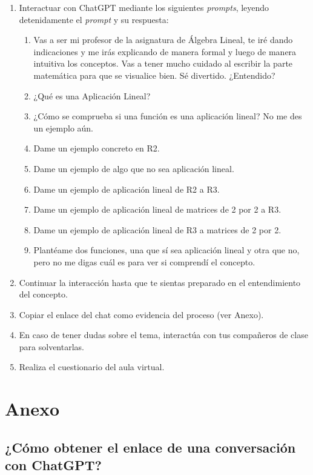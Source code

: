 \documentclass[a4,11pt]{aleph-notas}
\begin{document}
\begin{enumerate}[leftmargin=*]
    \item Interactuar con ChatGPT mediante los siguientes \textit{prompts}, leyendo detenidamente el \textit{prompt} y su respuesta:
    \begin{enumerate}[label=\textit{Prompt \arabic*.},leftmargin=2.1cm]
        \item Vas a ser mi profesor de la asignatura de Álgebra Lineal, te iré dando indicaciones y me irás explicando de manera formal y luego de manera intuitiva los conceptos. Vas a tener mucho cuidado al escribir la parte matemática para que se visualice bien. Sé divertido. ¿Entendido?
        \item ¿Qué es una Aplicación Lineal?
        \item ¿Cómo se comprueba si una función es una aplicación lineal? No me des un ejemplo aún.
        \item Dame un ejemplo concreto en R2.
        \item Dame un ejemplo de algo que no sea aplicación lineal.
        \item Dame un ejemplo de aplicación lineal de R2 a R3.
        \item Dame un ejemplo de aplicación lineal de matrices de 2 por 2 a R3.
        \item Dame un ejemplo de aplicación lineal de R3 a matrices de 2 por 2.
        \item Plantéame dos funciones, una que sí sea aplicación lineal y otra que no, pero no me digas cuál es para ver si comprendí el concepto.
    \end{enumerate}
    \item Continuar la interacción hasta que te sientas preparado en el entendimiento del concepto.
    \item Copiar el enlace del chat como evidencia del proceso (ver Anexo).
    \item En caso de tener dudas sobre el tema, interactúa con tus compañeros de clase para solventarlas.
    \item Realiza el cuestionario del aula virtual.
\end{enumerate}

\section*{Anexo}

\subsection*{¿Cómo obtener el enlace de una conversación con ChatGPT?}
\end{document}
